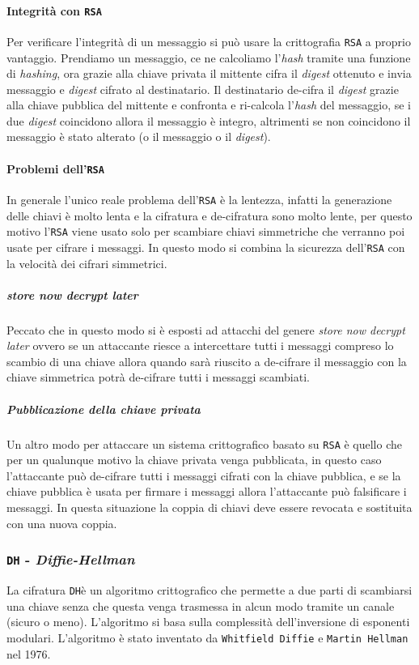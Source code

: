             \paragraph{Integrità con \texttt{RSA}}
                Per verificare l'integrità di un messaggio si può usare la crittografia \texttt{RSA} a proprio vantaggio. Prendiamo un messaggio, ce ne calcoliamo l'\textit{hash} tramite una funzione di \textit{hashing}, ora grazie alla chiave privata il mittente cifra il \textit{digest} ottenuto e invia messaggio e \textit{digest} cifrato al destinatario. Il destinatario de-cifra il \textit{digest} grazie alla chiave pubblica del mittente e confronta e ri-calcola l'\textit{hash} del messaggio, se i due \textit{digest} coincidono allora il messaggio è integro, altrimenti se non coincidono il messaggio è stato alterato (o il messaggio o il \textit{digest}).
            \paragraph{Problemi dell'\texttt{RSA}} In generale l'unico reale problema dell'\texttt{RSA} è la lentezza, infatti la generazione delle chiavi è molto lenta e la cifratura e de-cifratura sono molto lente, per questo motivo l'\texttt{RSA} viene usato solo per scambiare chiavi simmetriche che verranno poi usate per cifrare i messaggi. In questo modo si combina la sicurezza dell'\texttt{RSA} con la velocità dei cifrari simmetrici.
                \subparagraph{\textit{store now decrypt later}} Peccato che in questo modo si è esposti ad attacchi del genere \textit{store now decrypt later} ovvero se un attaccante riesce a intercettare tutti i messaggi compreso lo scambio di una chiave allora quando sarà riuscito a de-cifrare il messaggio con la chiave simmetrica potrà de-cifrare tutti i messaggi scambiati.
                \subparagraph{Pubblicazione della chiave privata} Un altro modo per attaccare un sistema crittografico basato su \texttt{RSA} è quello che per un qualunque motivo la chiave privata venga pubblicata, in questo caso l'attaccante può de-cifrare tutti i messaggi cifrati con la chiave pubblica, e se la chiave pubblica è usata per firmare i messaggi allora l'attaccante può falsificare i messaggi. In questa situazione la coppia di chiavi deve essere revocata e sostituita con una nuova coppia.

            \subsubsection{\texttt{DH} - \textit{Diffie-Hellman}}
                La cifratura \texttt{DH}è un algoritmo crittografico che permette a due parti di scambiarsi una chiave senza che questa venga trasmessa in alcun modo tramite un canale (sicuro o meno). L'algoritmo si basa sulla complessità dell'inversione di esponenti modulari. L'algoritmo è stato inventato da \texttt{Whitfield Diffie} e \texttt{Martin Hellman} nel 1976.
